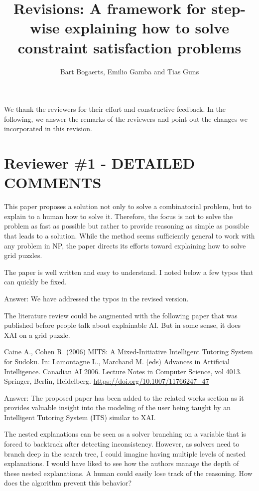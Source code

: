 \documentclass{article}
\title{Revisions: A framework for step-wise explaining how to solve constraint satisfaction problems}
\author{Bart Bogaerts, Emilio Gamba and Tias Guns}
\date{}
\newcommand\comment[1]{\marginpar{\tiny #1}}
\renewcommand\comment[1]{#1}
\newcommand{\emilio}[1]{{\comment{Answer: \color{red}#1}}}
\begin{document}
	\maketitle
We thank the reviewers for their effort and constructive feedback. In the following, we answer the remarks of the reviewers and point out the changes we incorporated in this revision.

\section*{Reviewer \#1 - DETAILED COMMENTS}

This paper proposes a solution not only to solve a combinatorial
problem, but to explain to a human how to solve it. Therefore, the
focus is not to solve the problem as fast as possible but rather to
provide reasoning as simple as possible that leads to a solution. While
the method seems sufficiently general to work with any problem in NP,
the paper directs its efforts toward explaining how to solve grid
puzzles.

\begin{quoteit}
The paper is well written and easy to understand. I noted below a few typos that can quickly be fixed.
\end{quoteit}

\emilio{We have addressed the typos in the revised version.}

\begin{quoteit}
The literature review could be augmented with the following paper that was published before people talk about explainable AI. But in some sense, it does XAI on a grid puzzle.

Caine A., Cohen R. (2006) MITS: A Mixed-Initiative Intelligent Tutoring System for Sudoku. In: Lamontagne L., Marchand M. (eds) Advances in Artificial Intelligence. Canadian AI 2006. Lecture Notes in Computer Science, vol 4013. Springer, Berlin, Heidelberg. \url{https://doi.org/10.1007/11766247_47}
\end{quoteit}

\emilio{The proposed paper has been added to the related works section as it provides valuable insight into the modeling of the user being taught by an Intelligent Tutoring System (ITS) similar to XAI.}

\begin{quoteit}
The nested explanations can be seen as a solver branching on a variable that is forced to backtrack after detecting inconsistency. However, as solvers need to branch deep in the search tree, I could imagine having multiple levels of nested explanations. I would have liked to see how the authors manage the depth of these nested explanations. A human could easily lose track of the reasoning. How does the algorithm prevent this behavior?
\end{quoteit}
\end{document}
